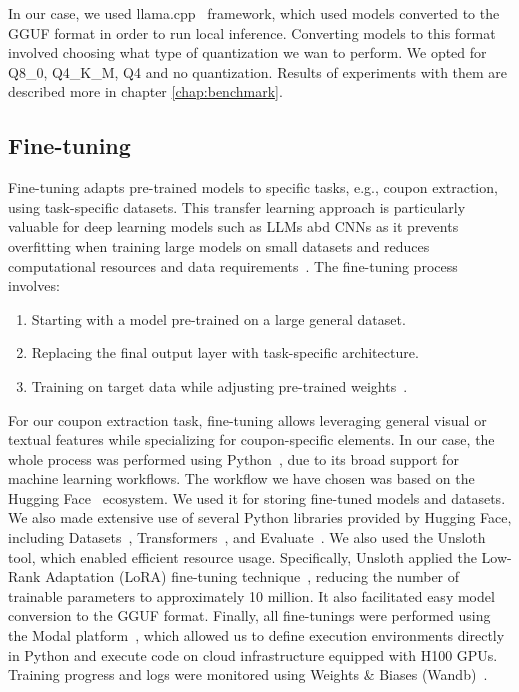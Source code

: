 \documentclass[licencjacka,en]{pracamgr}
\begin{document}
In our case, we used llama.cpp~\cite{llama-cpp} framework, which used models converted to the GGUF format in order to run local inference. Converting models to this format involved choosing what type of quantization we wan to perform. We opted for Q8\_0, Q4\_K\_M, Q4 and no quantization. Results of experiments with them are described more in chapter \ref{chap:benchmark}.

\subsection{Fine-tuning}
Fine-tuning adapts pre-trained models to specific tasks, e.g., coupon extraction, using task-specific datasets. This transfer learning approach is particularly valuable for deep learning models such as LLMs abd CNNs as it prevents overfitting when training large models on small datasets and reduces computational resources and data requirements~\cite{ibm_fine-tuning}. The fine-tuning process involves:
\begin{enumerate}
    \item Starting with a model pre-trained on a large general dataset.
    \item Replacing the final output layer with task-specific architecture.
    \item Training on target data while adjusting pre-trained weights~\cite{finetune_cool_image}.
\end{enumerate}

For our coupon extraction task, fine-tuning allows leveraging general visual or textual features while specializing for coupon-specific elements. In our case, the whole process was performed using Python~\cite{python}, due to its broad support for machine learning workflows. The workflow we have chosen was based on the Hugging Face~\cite{hugging-face} ecosystem. We used it for storing fine-tuned models and datasets. We also made extensive use of several Python libraries provided by Hugging Face, including Datasets~\cite{lhoest2021datasetscommunitylibrarynatural}, Transformers~\cite{wolf-etal-2020-transformers}, and Evaluate~\cite{evaluate}. We also used the Unsloth~\cite{unsloth} tool, which enabled efficient resource usage. Specifically, Unsloth applied the Low-Rank Adaptation (LoRA) fine-tuning technique~\cite{hu2021loralowrankadaptationlarge}, reducing the number of trainable parameters to approximately 10 million. It also facilitated easy model conversion to the GGUF format. Finally, all fine-tunings were performed using the Modal platform~\cite{modal}, which allowed us to define execution environments directly in Python and execute code on cloud infrastructure equipped with H100 GPUs. Training progress and logs were monitored using Weights \& Biases (Wandb)~\cite{wandb}.
\end{document}
